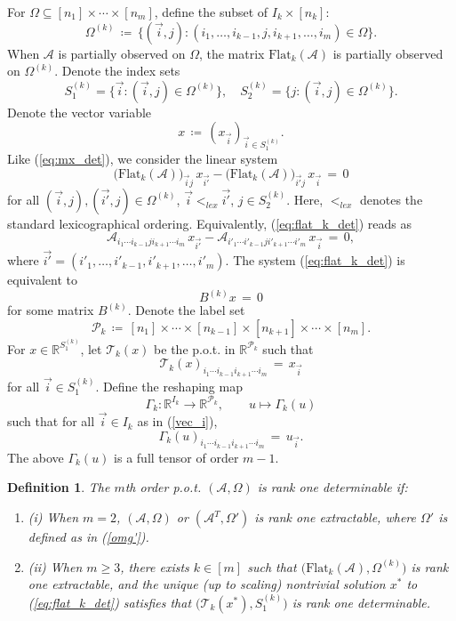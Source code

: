 \documentclass{amsart}
\newcommand{\re}{\mathbb{R}}
\newcommand{\reff}[1]{(\ref{#1})}
\newcommand{\mc}[1]{\mathcal{#1}}
\newcommand{\ddd}{,\ldots,}
\newcommand{\Flat}{\mbox{Flat}}
\newcommand{\bnum}{\begin{enumerate}}
\newcommand{\enum}{\end{enumerate}}
\newcommand{\be}{\begin{equation}}
\newcommand{\ee}{\end{equation}}
\newtheorem{defi}[theorem]{Definition}
\theoremstyle{definition}
\numberwithin{equation}{section}
\begin{document}
For $\Omega \subseteq [n_1] \times \cdots \times [n_m]$,
define the subset of $I_k \times [n_k]$:
\be\label{Omg^k}
\Omega^{(k)} \,\coloneqq\, \{ ( \vec{i}, j ) : 
( i_1 \ddd i_{k-1}, j, i_{k+1} \ddd i_m ) \in \Omega \}.
\ee
When $\mc{A}$ is partially observed on $\Omega$, 
the matrix $\Flat_k(\mc{A})$ is partially observed on $\Omega^{(k)}$.
Denote the index sets
\be\label{S1kS2k}
S^{(k)}_1 = \big\{ \vec{i} : (\vec{i},j) \in \Omega^{(k)} \big\}, 
\quad S^{(k)}_2 = \big\{ j : (\vec{i},j) \in \Omega^{(k)} \big\}.
\ee
Denote the vector variable
\[
x \,\coloneqq\, ( x_{\vec{i}} )_{\vec{i} \in S_1^{(k)}}.
\]
Like \reff{eq:mx_det},
we consider the linear system
\be\label{eq:flat_k_det}
\big(\Flat_k(\mc A)\big)_{\vec{i} j} \, x_{\vec{i'} } - \big(\Flat_k(\mc A)\big)_{\vec{i'} j} \, x_{\vec{i}} \,=\, 0
\ee
for all 
$(\vec{i}, j), (\vec{i'}, j) \in \Omega^{(k)}$, $\vec{i} <_{lex} \vec{i'}$, $j \in S^{(k)}_2$.
Here, $<_{lex}$ denotes the standard lexicographical ordering.
Equivalently, \reff{eq:flat_k_det} reads as
\[
\mc A_{i_{1}\cdots i_{k-1} j i_{k+1}\cdots i_{m}} \, x_{\vec{i'}}
-
\mc A_{i'_{1}\cdots i'_{k-1} j i'_{k+1}\cdots i'_{m}} \, x_{\vec{i}} \,=\, 0,
\]
where $\vec{i'} = ( i'_1 \ddd i'_{k-1}, i'_{k+1} \ddd i'_m )$.
The system \reff{eq:flat_k_det} is equivalent to
\be\label{Bx=0}
B^{(k)}  x \,=\, 0
\ee
for some matrix $B^{(k)}$.
Denote the label set
\be\label{P_k}
\mc{P}_k \,\coloneqq\, [n_1] \times \cdots \times [n_{k-1}] \times [n_{k+1}] \times \cdots \times [n_m].
\ee
For $x \in \re^{S_1^{(k)}}$, 
let $\mc{T}_k(x)$ be the p.o.t. in 
$\re^{\mc{P}_k}$
such that
\be\label{up_k}
\mc{T}_k(x)_{i_1 \cdots i_{k-1} i_{k+1} \cdots i_m} \,=\, x_{\vec{i}}
\ee
for all $\vec{i} \in S^{(k)}_1$.
Define the reshaping map 
\be\label{gm_k}
\Gamma_k : \re^{I_k} \to \re^{\mc{P}_k},
\qquad u \mapsto \Gamma_k (u)
\ee
such that for all $\vec{i} \in I_k$ as in \reff{vec_i},
\[
\Gamma_k (u)_{i_1 \cdots i_{k-1} i_{k+1} \cdots i_m}
\,=\, u_{\vec{i}}.
\]
The above $\Gamma_k (u)$ is a full tensor of order $m-1$.


\begin{defi}\label{def:rank1-det}
The $m$th order p.o.t. $(\mc{A}, \Omega)$ is rank one determinable if:
\bnum

\item[(i)] When $m=2$, $(\mc{A}, \Omega)$ or $(\mc{A}^T, \Omega')$ is rank one extractable, 
where $\Omega'$ is defined as in \reff{omg'}.


\item[(ii)] When $m \ge 3$, there exists $k \in [m]$ such that
$\big( \Flat_k(\mc{A}), \Omega^{(k)} \big)$ is rank one extractable,
and the unique (up to scaling) nontrivial solution $x^*$ to \reff{eq:flat_k_det} satisfies that
$\big( \mc{T}_k(x^*), S_1^{(k)} \big)$ is rank one determinable.
\enum
\end{defi}
\end{document}
